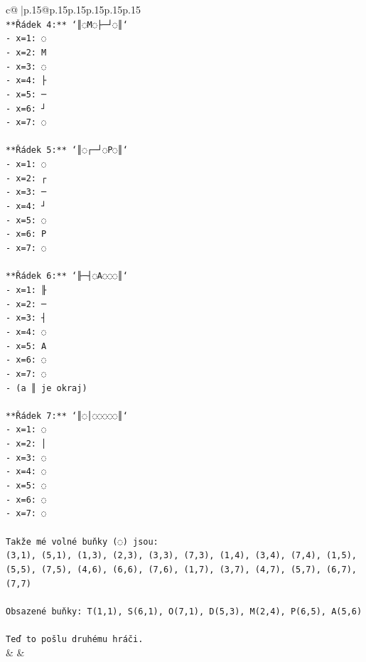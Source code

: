 \documentclass{article}
\begin{document}
{\begin{supertabular}{c@{$\;$}|p{.15\linewidth}@{}p{.15\linewidth}p{.15\linewidth}p{.15\linewidth}p{.15\linewidth}p{.15\linewidth}}
{{{\\ 
\texttt{**Řádek 4:** `║◌M◌├─┘◌║`} \\
\texttt{{-} x=1: ◌} \\
\texttt{{-} x=2: M} \\
\texttt{{-} x=3: ◌} \\
\texttt{{-} x=4: ├} \\
\texttt{{-} x=5: ─} \\
\texttt{{-} x=6: ┘} \\
\texttt{{-} x=7: ◌} \\
\\ 
\texttt{**Řádek 5:** `║◌┌─┘◌P◌║`} \\
\texttt{{-} x=1: ◌} \\
\texttt{{-} x=2: ┌} \\
\texttt{{-} x=3: ─} \\
\texttt{{-} x=4: ┘} \\
\texttt{{-} x=5: ◌} \\
\texttt{{-} x=6: P} \\
\texttt{{-} x=7: ◌} \\
\\ 
\texttt{**Řádek 6:** `╟─┤◌A◌◌◌║`} \\
\texttt{{-} x=1: ╟} \\
\texttt{{-} x=2: ─} \\
\texttt{{-} x=3: ┤} \\
\texttt{{-} x=4: ◌} \\
\texttt{{-} x=5: A} \\
\texttt{{-} x=6: ◌} \\
\texttt{{-} x=7: ◌} \\
\texttt{{-} (a ║ je okraj)} \\
\\ 
\texttt{**Řádek 7:** `║◌│◌◌◌◌◌║`} \\
\texttt{{-} x=1: ◌} \\
\texttt{{-} x=2: │} \\
\texttt{{-} x=3: ◌} \\
\texttt{{-} x=4: ◌} \\
\texttt{{-} x=5: ◌} \\
\texttt{{-} x=6: ◌} \\
\texttt{{-} x=7: ◌} \\
\\ 
\texttt{Takže mé volné buňky (◌) jsou:} \\
\texttt{(3,1), (5,1), (1,3), (2,3), (3,3), (7,3), (1,4), (3,4), (7,4), (1,5), (5,5), (7,5), (4,6), (6,6), (7,6), (1,7), (3,7), (4,7), (5,7), (6,7), (7,7)} \\
\\ 
\texttt{Obsazené buňky: T(1,1), S(6,1), O(7,1), D(5,3), M(2,4), P(6,5), A(5,6)} \\
\\ 
\texttt{Teď to pošlu druhému hráči.} \\
            }
        }
    }
    & & \\ \\


\end{supertabular}}
\end{document}
